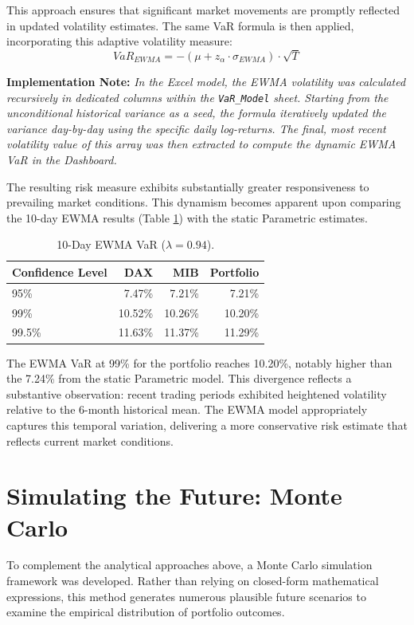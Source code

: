 \documentclass{report}
\begin{document}
This approach ensures that significant market movements are promptly reflected in updated volatility estimates. The same VaR formula is then applied, incorporating this adaptive volatility measure:
\[ VaR_{EWMA} = -\left(\mu + z_{\alpha} \cdot \sigma_{EWMA}\right) \cdot \sqrt{T} \]

\textbf{Implementation Note:} \textit{In the Excel model, the EWMA volatility was calculated recursively in dedicated columns within the \texttt{VaR\_Model} sheet. Starting from the unconditional historical variance as a seed, the formula iteratively updated the variance day-by-day using the specific daily log-returns. The final, most recent volatility value of this array was then extracted to compute the dynamic EWMA VaR in the Dashboard.}

The resulting risk measure exhibits substantially greater responsiveness to prevailing market conditions. This dynamism becomes apparent upon comparing the 10-day EWMA results (Table \ref{tab:ewma}) with the static Parametric estimates.

\begin{table}[H]
    \centering
    \begin{tabular}{lrrr}
        \toprule
        \textbf{Confidence Level} & \textbf{DAX} & \textbf{MIB} & \textbf{Portfolio} \\
        \midrule
        95\% & 7.47\% & 7.21\% & 7.21\% \\
        99\% & 10.52\% & 10.26\% & 10.20\% \\
        99.5\% & 11.63\% & 11.37\% & 11.29\% \\
        \bottomrule
    \end{tabular}
    \caption{10-Day EWMA VaR ($\lambda = 0.94$).}
    \label{tab:ewma}
\end{table}

The EWMA VaR at 99\% for the portfolio reaches 10.20\%, notably higher than the 7.24\% from the static Parametric model. This divergence reflects a substantive observation: recent trading periods exhibited heightened volatility relative to the 6-month historical mean. The EWMA model appropriately captures this temporal variation, delivering a more conservative risk estimate that reflects current market conditions.

\section{Simulating the Future: Monte Carlo}
To complement the analytical approaches above, a Monte Carlo simulation framework was developed. Rather than relying on closed-form mathematical expressions, this method generates numerous plausible future scenarios to examine the empirical distribution of portfolio outcomes.
\end{document}
